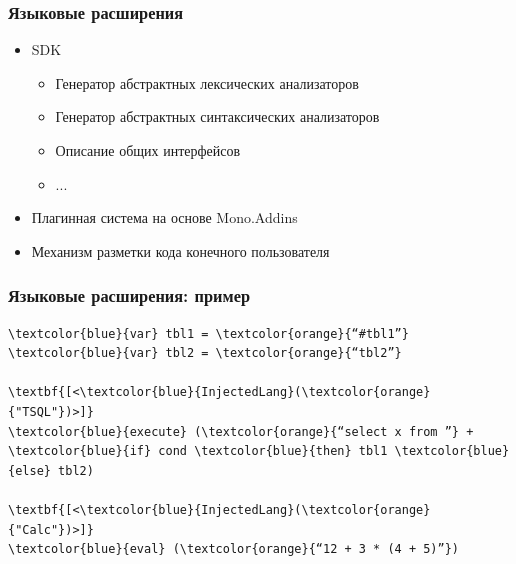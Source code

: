 \documentclass{beamer}
\begin{document}
\begin{frame}[fragile]
	\transwipe[direction=90]
	\frametitle{Языковые расширения}
	\begin{itemize}
	    \item SDK
    	\begin{itemize}
    		\item Генератор абстрактных лексических анализаторов
        	\item Генератор абстрактных синтаксических анализаторов
        	\item Описание общих интерфейсов
        	\item ...
        \end{itemize}
	    \item Плагинная система на основе Mono.Addins
	    \item Механизм разметки кода конечного пользователя
    \end{itemize}
\end{frame}

\begin{frame}[fragile]
	\transwipe[direction=90]
	\frametitle{Языковые расширения: пример}
	\begin{Verbatim}[commandchars=\\\{\}]
\textcolor{blue}{var} tbl1 = \textcolor{orange}{“#tbl1”} 
\textcolor{blue}{var} tbl2 = \textcolor{orange}{“tbl2”}

\textbf{[<\textcolor{blue}{InjectedLang}(\textcolor{orange}{"TSQL"})>]}
\textcolor{blue}{execute} (\textcolor{orange}{“select x from ”} + \textcolor{blue}{if} cond \textcolor{blue}{then} tbl1 \textcolor{blue}{else} tbl2)

\textbf{[<\textcolor{blue}{InjectedLang}(\textcolor{orange}{"Calc"})>]}
\textcolor{blue}{eval} (\textcolor{orange}{“12 + 3 * (4 + 5)”})
        \end{Verbatim}
\end{frame}
\end{document}
